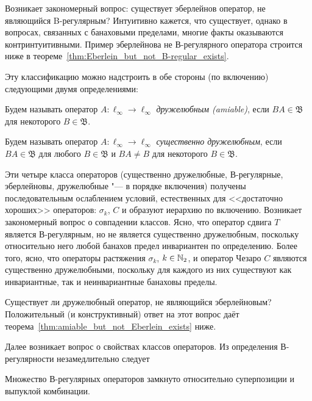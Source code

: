 
Возникает закономерный вопрос: существует эберлейнов оператор, не являющийся B-регулярным?
Интуитивно кажется, что существует, однако в вопросах, связанных с банаховыми пределами,
многие факты оказываются контринтуитивными.
Пример эберлейнова не В-регулярного оператора строится ниже
в теореме~\ref{thm:Eberlein_but_not_B-regular_exists}.

Эту классификацию можно надстроить в обе стороны (по включению) следующими двумя определениями:

\begin{definition}
	Будем называть оператор $A:\ell_\infty \to \ell_\infty$ \emph{дружелюбным (amiable)}, если $BA\in\mathfrak B$ для некоторого $B\in\mathfrak B$.
\end{definition}

\begin{definition}
	Будем называть оператор $A:\ell_\infty \to \ell_\infty$ \emph{существенно дружелюбным}, если $BA\in\mathfrak B$ для любого $B\in\mathfrak B$ и $BA\ne B$ для некоторого $B\in\mathfrak B$.
\end{definition}

Эти четыре класса операторов (существенно дружелюбные, В-регулярные, эберлейновы, дружелюбные "--- в порядке включения)
получены последовательным ослаблением условий, естественных для <<достаточно хороших>> операторов:
$\sigma_k$, $C$
и образуют иерархию по включению.
Возникает закономерный вопрос о совпадении классов.
Ясно, что оператор сдвига $T$ является В-регулярным, но не является существенно дружелюбным, поскольку относительно него любой банахов предел инвариантен по определению.
Более того, ясно, что операторы растяжения $\sigma_k$, $k\in\mathbb{N}_2$, и оператор Чезаро $C$ являются существенно дружелюбными,
поскольку для каждого из них существуют как инвариантные, так и неинвариантные банаховы пределы.

Существует ли дружелюбный оператор, не являющийся эберлейновым?
Положительный (и конструктивный) ответ на этот вопрос даёт теорема~\ref{thm:amiable_but_not_Eberlein_exists} ниже.



Далее возникает вопрос о свойствах классов операторов.
Из определения В-регулярности незамедлительно следует

\begin{lemma}
	\label{lem:B-regular_superposition_and_addition}
	Множество В-регулярных операторов замкнуто относительно суперпозиции и выпуклой комбинации.
\end{lemma}


